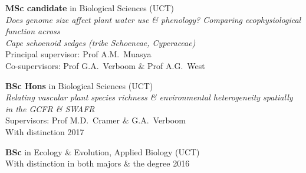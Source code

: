 \begin{hangparas}{2em}{1}

\textbf{MSc candidate} in Biological Sciences (UCT)                           \\
  \hspace{2em} \textit{Does genome size affect plant water use \& phenology?
    Comparing ecophysiological function across}                               \\
  \hspace{2em} \textit{Cape schoenoid sedges (tribe Schoeneae, Cyperaceae)}   \\
  \hspace{2em} Principal supervisor: Prof A.M.~Muasya                         \\
  \hspace{2em} Co-supervisors: Prof G.A.~Verboom \& Prof A.G.~West

\textbf{BSc Hons} in Biological Sciences (UCT)                                \\
\hspace{2em} \textit{Relating vascular plant species richness \&
  environmental heterogeneity spatially in the GCFR \& SWAFR}                 \\
\hspace{2em} Supervisors: Prof M.D.~Cramer \& G.A.~Verboom                    \\
\hspace{2em} With distinction                                        \hfill 2017

\textbf{BSc} in Ecology \& Evolution, Applied Biology (UCT)                   \\
\hspace{2em} With distinction in both majors \& the degree           \hfill 2016

\end{hangparas}
